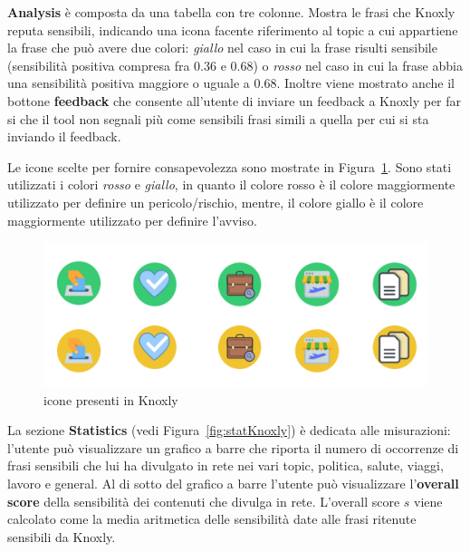 \textbf{Analysis} è composta da una tabella con tre colonne. Mostra le frasi che Knoxly reputa sensibili, indicando una icona facente riferimento al topic a cui appartiene la frase che può avere due colori: \textit{giallo} nel caso in cui la frase risulti sensibile (sensibilità positiva compresa fra $0.36$ e $0.68$) o \textit{rosso} nel caso in cui la frase abbia una sensibilità positiva maggiore o uguale a $0.68$. Inoltre viene mostrato anche il bottone \textbf{feedback} che consente all'utente di inviare un feedback a Knoxly per far si che il tool non segnali più come sensibili frasi simili a quella per cui si sta inviando il feedback.

Le icone scelte per fornire consapevolezza sono mostrate in Figura~\ref{fig:bollini}. Sono stati utilizzati i colori \textit{rosso} e \textit{giallo}, in quanto il colore rosso è il colore maggiormente utilizzato per definire un pericolo/rischio, mentre, il colore giallo è il colore maggiormente utilizzato per definire l'avviso.
\begin{figure}[h!t]
    \centering
    \includegraphics[scale=0.7]{Figure/ui/bollini.png}
    \caption{icone presenti in Knoxly}
    \label{fig:bollini}
\end{figure}
\FloatBarrier


La sezione \textbf{Statistics} (vedi Figura~\ref{fig:statKnoxly}) è dedicata alle misurazioni: l'utente può visualizzare un grafico a barre che riporta il numero di occorrenze di frasi sensibili che lui ha divulgato in rete nei vari topic, politica, salute, viaggi, lavoro e general. Al di sotto del grafico a barre l'utente può visualizzare l'\textbf{overall score} della sensibilità dei contenuti che divulga in rete. L'overall score $s$ viene calcolato come la media aritmetica delle sensibilità date alle frasi ritenute sensibili da Knoxly.

